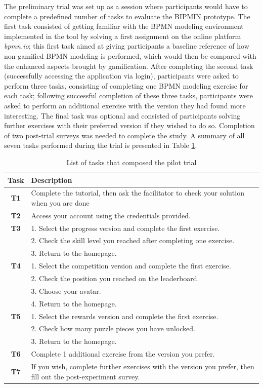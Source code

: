 The preliminary trial was set up as a session where participants would have to complete a predefined number of tasks to evaluate the BIPMIN prototype. The first task consisted of getting familiar with the BPMN modeling environment implemented in the tool by solving a first assignment on the online platform \emph{bpmn.io}; this first task aimed at giving participants a baseline reference of how non-gamified BPMN modeling is performed, which would then be compared with the enhanced aspects brought by gamification. After completing the second task (successfully accessing the application via login), participants were asked to perform three tasks, consisting of completing one BPMN modeling exercise for each task; following successful completion of these three tasks, participants were asked to perform an additional exercise with the version they had found more interesting. The final task was optional and consisted of participants solving further exercises with their preferred version if they wished to do so. Completion of two post-trial surveys was needed to complete the study. A summary of all seven tasks performed during the trial is presented in Table \ref{tab:tasks}.


\begin{table}[H] 
\centering
\footnotesize
\caption{List of tasks that composed the pilot trial} 
\begin{tabular}{cp{}} 
\toprule
 \textbf{Task} & \textbf{Description}\\ 
\midrule
\textbf{T1} & Complete the tutorial, then ask the facilitator to check your solution when you are done \\ 
\midrule
\textbf{T2} & Access your account using the credentials provided. \\ 
\midrule
\textbf{T3} & 1. Select the progress version and complete the first exercise. \\
   & 2. Check the skill level you reached after completing one exercise. \\
   & 3. Return to the homepage. \\ 
\midrule
\textbf{T4} & 1. Select the competition version and complete the first exercise. \\ 
   & 2. Check the position you reached on the leaderboard. \\ 
   & 3. Choose your avatar. \\ 
   & 4. Return to the homepage. \\ 
\midrule
\textbf{T5} & 1. Select the rewards version and complete the first exercise. \\ 
   & 2. Check how many puzzle pieces you have unlocked. \\ 
   & 3. Return to the homepage. \\ 
\midrule
\textbf{T6} & Complete 1 additional exercise from the version you prefer. \\ 
\midrule
\textbf{T7} & If you wish, complete further exercises with the version you prefer, then fill out the post-experiment survey. \\ 
\bottomrule
\end{tabular}
\label{tab:tasks}
\end{table}

